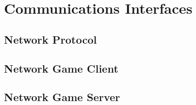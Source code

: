 \section{Communications Interfaces} \label{sec:communications_interfaces}


\subsection{Network Protocol}

\subsection{Network Game Client}

\subsection{Network Game Server}

